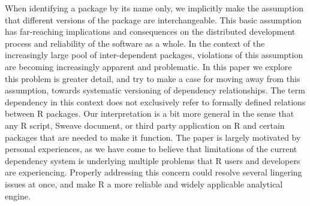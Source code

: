 When identifying a package by its name only, we implicitly make the assumption
that different versions of the package are interchangeable. This basic
assumption has far-reaching implications and consequences on the distributed
development process and reliability of the software as a whole. In the context
of the increasingly large pool of inter-dependent packages, violations of this
assumption are becoming increasingly apparent and problematic. In this paper we
explore this problem is greater detail, and try to make a case for moving away
from this assumption, towards systematic versioning of dependency relationships.
The term dependency in this context does not exclusively refer to formally
defined relations between R packages. Our interpretation is a bit more general in
the sense that any R script, Sweave document, or third party application
 on R and certain packages that are needed to make it function.
The paper is largely motivated by personal experiences, as we have come to
believe that limitations of the current dependency system is underlying
multiple problems that R users and developers are experiencing. Properly
addressing this concern could resolve several lingering issues at once,
and make R a more reliable and widely applicable analytical engine.



%
%
%













